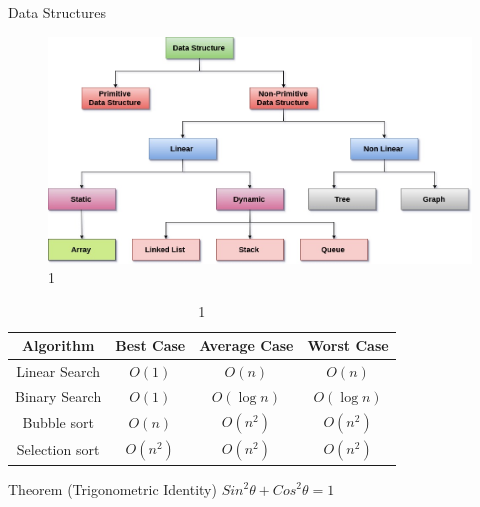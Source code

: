 \documentclass{beamer}[10pt]
\begin{document}
\begin{frame}{Data Structures}

    
\begin{figure}
    \centering
    \includegraphics[scale=0.25]{Image 1.jpeg}
    \caption{1}
    \label{fig:my_label}
\end{figure}
    
\end{frame}

\begin{frame}{}
    
    \begin{center}
        \begin{table}[t]
            \centering
            \begin{tabular}{|c|c|c|c|}
            \hline
            Algorithm  & Best Case  & Average Case & Worst Case  \\
             \hline
             \hline
             Linear Search & $O(1)$ & $O(n)$ & $O(n)$ \\
             Binary Search & $O(1)$ & $O(\log n)$ & $O(\log n)$ \\
             Bubble sort & $O(n)$ & $O(n^2)$ & $O(n^2)$ \\
             Selection sort & $O(n^2)$ & $O(n^2)$ & $O(n^2)$ \\
             \hline
            \end{tabular}
            \caption{1}
            \label{tab:table1}
        \end{table}
    \end{center}
    
    \begin{block}{Theorem (Trigonometric Identity)}
    $Sin ^2 \theta + Cos ^2 \theta = 1$
    \end{block}
    
\end{frame}
\end{document}
